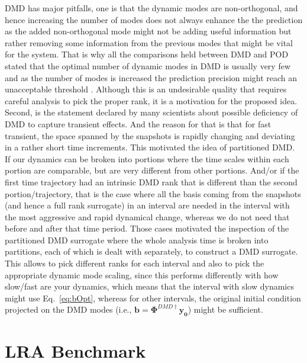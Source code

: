 \documentclass{anstrans}
\renewcommand{\vec}[1]{\bm{#1}} %
\begin{document}
DMD has major pitfalls, one is that the dynamic modes are non-orthogonal, and hence increasing the number of modes does not always enhance the the prediction as the added non-orthogonal mode might not be adding useful information but rather removing some information from the previous modes that might be vital for the system. 
That is why all the comparisons held between DMD and POD stated that the optimal number of dynamic modes in DMD is usually very few and as the number of modes is increased the prediction precision might reach an unacceptable threshold \cite{DMDvsPOD}. 
Although this is an undesirable quality that requires careful analysis to pick the proper rank, it is a motivation for the proposed idea. 
Second, is the statement declared by many scientists about possible deficiency of DMD to capture transient effects. 
And the reason for that is that for fast transient, the space spanned by the snapshots is rapidly changing and deviating in a rather short time increments. 
This motivated the idea of partitioned DMD. 
If our dynamics can be broken into portions where the time scales within each portion are comparable, but are very different from other portions. 
And/or if the first time trajectory had an intrinsic DMD rank that is different than the second portion/trajectory, that is the case where all the basis coming from the snapshots (and hence a full rank surrogate) in an interval are needed in the interval with the most aggressive and rapid dynamical change, whereas we do not need that before and after that time period. 
Those cases motivated the inspection of the partitioned DMD surrogate where the whole analysis time is broken into partitions, each of which is dealt with separately, to construct a DMD surrogate. 
This allows to pick different ranks for each interval and also to pick the appropriate dynamic mode scaling, since this performs differently with how slow/fast are your dynamics, which means that the interval with slow dynamics might use Eq.~\ref{eq:bOpt}, whereas for other intervals, the original initial condition projected on the DMD modes (i.e., $\vec{b}={\boldsymbol{\Phi}^{DMD\dagger}} \vec{y_0}$) might be sufficient.


\section{LRA Benchmark}
\label{sec:application}

\end{document}
